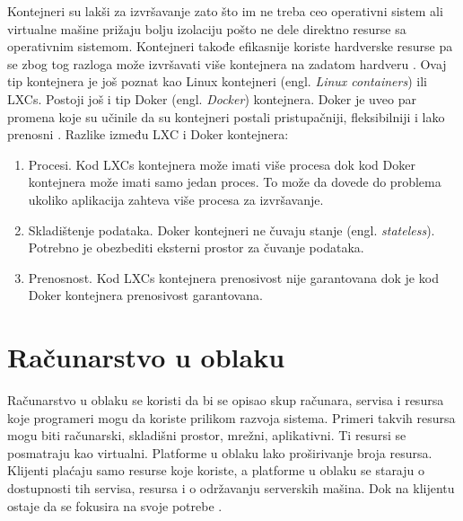 \documentclass[12pt,oneside]{memoir}
\begin{document}
Kontejneri su lakši za izvršavanje zato što im ne treba ceo operativni sistem ali virtualne mašine prižaju bolju izolaciju pošto ne dele direktno resurse sa operativnim sistemom. Kontejneri takođe efikasnije koriste hardverske resurse pa se zbog tog razloga može izvršavati više kontejnera na zadatom hardveru \cite{mac}. Ovaj tip kontejnera je još poznat kao Linux kontejneri (engl. \emph{Linux containers}) ili LXCs. Postoji još i tip Doker (engl. \emph{Docker}) kontejnera. Doker je uveo par promena koje su učinile da su kontejneri postali pristupačniji, fleksibilniji i lako prenosni \cite{gswc}. Razlike između LXC i Doker kontejnera:
\begin{enumerate}
  \item Procesi. Kod LXCs kontejnera može imati više procesa dok kod Doker kontejnera može imati samo jedan proces. To može da dovede do problema ukoliko aplikacija zahteva više procesa za izvršavanje.
  \item Skladištenje podataka. Doker kontejneri ne čuvaju stanje (engl. \emph{stateless}). Potrebno je obezbediti eksterni prostor za čuvanje podataka.
  \item Prenosnost. Kod LXCs kontejnera prenosivost nije garantovana dok je kod Doker kontejnera prenosivost garantovana.
\end{enumerate}

\section{Računarstvo u oblaku}

Računarstvo u oblaku se koristi da bi se opisao skup računara, servisa i resursa koje programeri mogu da koriste prilikom razvoja sistema. Primeri takvih resursa mogu biti računarski, skladišni prostor, mrežni, aplikativni. Ti resursi se posmatraju kao virtualni. Platforme u oblaku lako proširivanje broja resursa. Klijenti plaćaju samo resurse koje koriste, a platforme u oblaku se staraju o dostupnosti tih servisa, resursa i o održavanju serverskih mašina. Dok na klijentu ostaje da se fokusira na svoje potrebe \cite{cc}.
\end{document}
